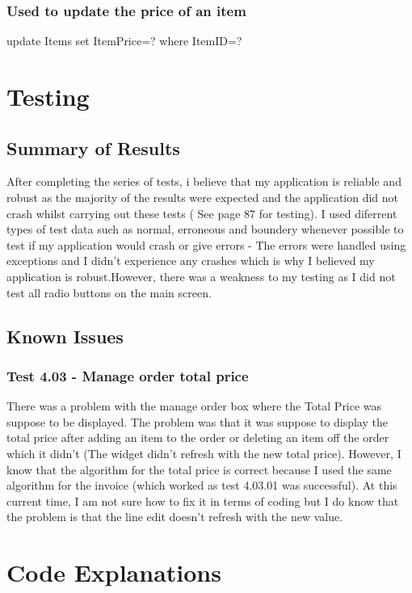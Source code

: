 \subsubsection{Used to update the price of an item}
\begin{sql}
update Items set ItemPrice=? where ItemID=?
\end{sql}

\section{Testing}

\subsection{Summary of Results}
After completing the series of tests, i believe that my application is reliable and robust as the majority of the results were expected and the application did not crash whilst carrying out these tests ( See page 87 for testing). I used diferrent types of test data such as normal, erroneous and boundery whenever possible to test if my application would crash or give errors - The errors were handled using exceptions and I didn't experience any crashes which is why I believed my application is robust.However, there was a weakness to my testing as I did not test all radio buttons on the main screen.


\subsection{Known Issues}

\subsubsection{Test 4.03 - Manage order total price}
There was a problem with the manage order box where the Total Price was suppose to be displayed. The problem was that it was suppose to display the total price after adding an item to the order or deleting an item off the order which it didn't (The widget didn't refresh with the new total price). However, I know that the algorithm for the total price is correct because I used the same algorithm for the invoice (which worked as test 4.03.01 was successful). At this current time, I am not sure how to fix it in terms of coding but I do know that the problem is that the line edit doesn't refresh with the new value.


\section{Code Explanations}

